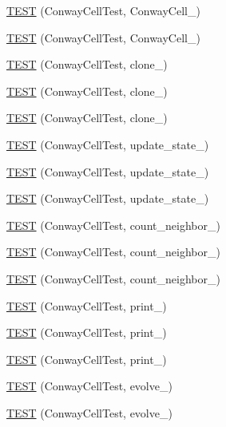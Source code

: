 \begin{DoxyCompactItemize}
\item 
\hyperlink{TestLife_8c_09_09_ac2f022d564741f654afb1dd355d26ad3}{T\-E\-S\-T} (Conway\-Cell\-Test, Conway\-Cell\-\_)
\item 
\hyperlink{TestLife_8c_09_09_a4c5d5309787bc8c9bcffdb24d02ea6e1}{T\-E\-S\-T} (Conway\-Cell\-Test, Conway\-Cell\-\_)
\item 
\hyperlink{TestLife_8c_09_09_a2e3bb707d6fdf1094e7a9a16be17633a}{T\-E\-S\-T} (Conway\-Cell\-Test, clone\-\_)
\item 
\hyperlink{TestLife_8c_09_09_a0b7d84469f9d9ddbc3b07069891d3b97}{T\-E\-S\-T} (Conway\-Cell\-Test, clone\-\_)
\item 
\hyperlink{TestLife_8c_09_09_a8ad94fcb4b832ea4d736f8e5256e5fae}{T\-E\-S\-T} (Conway\-Cell\-Test, clone\-\_)
\item 
\hyperlink{TestLife_8c_09_09_a3bc0d7991b76b926b09b6368f1e03d40}{T\-E\-S\-T} (Conway\-Cell\-Test, update\-\_\-state\-\_)
\item 
\hyperlink{TestLife_8c_09_09_af818b9be50f66aabd71c4870aa44480d}{T\-E\-S\-T} (Conway\-Cell\-Test, update\-\_\-state\-\_)
\item 
\hyperlink{TestLife_8c_09_09_a5e822f0a5e4d6c5c0e3bd07a8f3c170a}{T\-E\-S\-T} (Conway\-Cell\-Test, update\-\_\-state\-\_)
\item 
\hyperlink{TestLife_8c_09_09_a75d3ebff3629524251a80041e31c491c}{T\-E\-S\-T} (Conway\-Cell\-Test, count\-\_\-neighbor\-\_)
\item 
\hyperlink{TestLife_8c_09_09_a21eb67eace1125df6b86ad06b9710ea0}{T\-E\-S\-T} (Conway\-Cell\-Test, count\-\_\-neighbor\-\_)
\item 
\hyperlink{TestLife_8c_09_09_a14a360ddeaad7a300b7ee5b644e0d86c}{T\-E\-S\-T} (Conway\-Cell\-Test, count\-\_\-neighbor\-\_)
\item 
\hyperlink{TestLife_8c_09_09_aadd940d0c336c79812254f7e4ecee89a}{T\-E\-S\-T} (Conway\-Cell\-Test, print\-\_)
\item 
\hyperlink{TestLife_8c_09_09_a27e776d3c9d300d083d7ff5a6a3a26af}{T\-E\-S\-T} (Conway\-Cell\-Test, print\-\_)
\item 
\hyperlink{TestLife_8c_09_09_aed6ab7e6003effc2ebb2a1eb6160d550}{T\-E\-S\-T} (Conway\-Cell\-Test, print\-\_)
\item 
\hyperlink{TestLife_8c_09_09_a479b6125f1c26336aeba7ccc66cb4692}{T\-E\-S\-T} (Conway\-Cell\-Test, evolve\-\_)
\item 
\hyperlink{TestLife_8c_09_09_a759f1046fdb4301cf5ff38b4fbc37894}{T\-E\-S\-T} (Conway\-Cell\-Test, evolve\-\_)

\end{DoxyCompactItemize}
